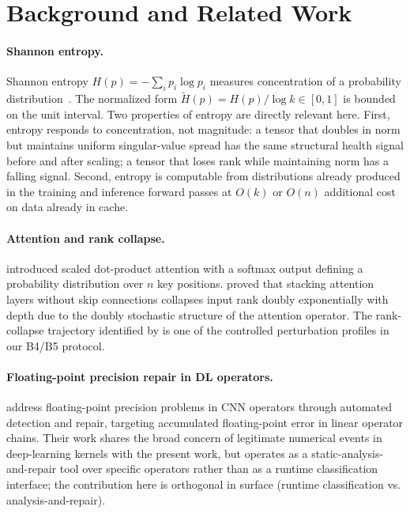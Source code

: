 \documentclass[11pt,a4paper]{article}
\theoremstyle{plain}
\begin{document}
\section{Background and Related Work}
\label{sec:background}

\paragraph{Shannon entropy.}
Shannon entropy $H(p) = -\sum_i p_i \log p_i$ measures concentration
of a probability distribution~\citep{shannon1948mathematical}.
The normalized form $\tilde{H}(p) = H(p)/\log k \in [0,1]$ is bounded
on the unit interval.
Two properties of entropy are directly relevant here.
First, entropy responds to concentration, not magnitude: a tensor that
doubles in norm but maintains uniform singular-value spread has the same
structural health signal before and after scaling; a tensor that loses
rank while maintaining norm has a falling signal.
Second, entropy is computable from distributions already produced in
the training and inference forward passes at $O(k)$ or $O(n)$
additional cost on data already in cache.

\paragraph{Attention and rank collapse.}
\citet{vaswani2017attention} introduced scaled dot-product attention
with a softmax output defining a probability distribution over $n$ key
positions.
\citet{dong2021attention} proved that stacking attention layers without
skip connections collapses input rank doubly exponentially with depth
due to the doubly stochastic structure of the attention operator.
The rank-collapse trajectory identified by \citet{dong2021attention}
is one of the controlled perturbation profiles in our B4/B5 protocol.

\paragraph{Floating-point precision repair in DL operators.}
\citet{liu2025automated} address floating-point precision problems in
CNN operators through automated detection and repair, targeting
accumulated floating-point error in linear operator chains.
Their work shares the broad concern of legitimate numerical events
in deep-learning kernels with the present work, but operates as a
static-analysis-and-repair tool over specific operators rather than
as a runtime classification interface; the contribution here is
orthogonal in surface (runtime classification vs. analysis-and-repair).
\end{document}
